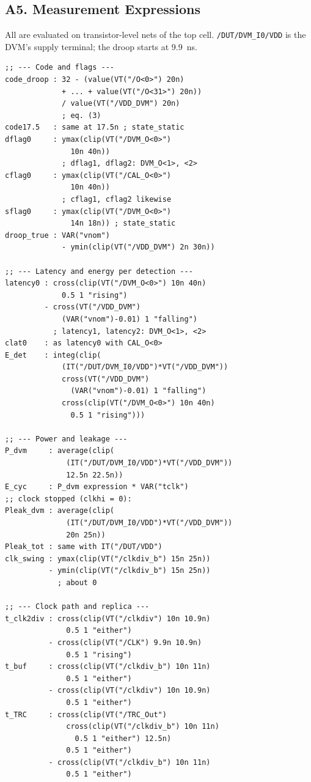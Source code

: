 \documentclass[conference]{IEEEtran}
\begin{document}
\subsection*{A5. Measurement Expressions}
All are evaluated on transistor-level nets of the top cell. \texttt{/DUT/DVM\_I0/VDD} is the DVM's supply terminal; the droop starts at 9.9~ns.
\begin{lstlisting}
;; --- Code and flags ---
code_droop : 32 - (value(VT("/O<0>") 20n)
             + ... + value(VT("/O<31>") 20n))
             / value(VT("/VDD_DVM") 20n)
             ; eq. (3)
code17.5   : same at 17.5n ; state_static
dflag0     : ymax(clip(VT("/DVM_O<0>")
               10n 40n))
             ; dflag1, dflag2: DVM_O<1>, <2>
cflag0     : ymax(clip(VT("/CAL_O<0>")
               10n 40n))
             ; cflag1, cflag2 likewise
sflag0     : ymax(clip(VT("/DVM_O<0>")
               14n 18n)) ; state_static
droop_true : VAR("vnom")
             - ymin(clip(VT("/VDD_DVM") 2n 30n))

;; --- Latency and energy per detection ---
latency0 : cross(clip(VT("/DVM_O<0>") 10n 40n)
             0.5 1 "rising")
         - cross(VT("/VDD_DVM")
             (VAR("vnom")-0.01) 1 "falling")
           ; latency1, latency2: DVM_O<1>, <2>
clat0    : as latency0 with CAL_O<0>
E_det    : integ(clip(
             (IT("/DUT/DVM_I0/VDD")*VT("/VDD_DVM"))
             cross(VT("/VDD_DVM")
               (VAR("vnom")-0.01) 1 "falling")
             cross(clip(VT("/DVM_O<0>") 10n 40n)
               0.5 1 "rising")))

;; --- Power and leakage ---
P_dvm     : average(clip(
              (IT("/DUT/DVM_I0/VDD")*VT("/VDD_DVM"))
              12.5n 22.5n))
E_cyc     : P_dvm expression * VAR("tclk")
;; clock stopped (clkhi = 0):
Pleak_dvm : average(clip(
              (IT("/DUT/DVM_I0/VDD")*VT("/VDD_DVM"))
              20n 25n))
Pleak_tot : same with IT("/DUT/VDD")
clk_swing : ymax(clip(VT("/clkdiv_b") 15n 25n))
          - ymin(clip(VT("/clkdiv_b") 15n 25n))
            ; about 0

;; --- Clock path and replica ---
t_clk2div : cross(clip(VT("/clkdiv") 10n 10.9n)
              0.5 1 "either")
          - cross(clip(VT("/CLK") 9.9n 10.9n)
              0.5 1 "rising")
t_buf     : cross(clip(VT("/clkdiv_b") 10n 11n)
              0.5 1 "either")
          - cross(clip(VT("/clkdiv") 10n 10.9n)
              0.5 1 "either")
t_TRC     : cross(clip(VT("/TRC_Out")
              cross(clip(VT("/clkdiv_b") 10n 11n)
                0.5 1 "either") 12.5n)
              0.5 1 "either")
          - cross(clip(VT("/clkdiv_b") 10n 11n)
              0.5 1 "either")
\end{lstlisting}
\end{document}
